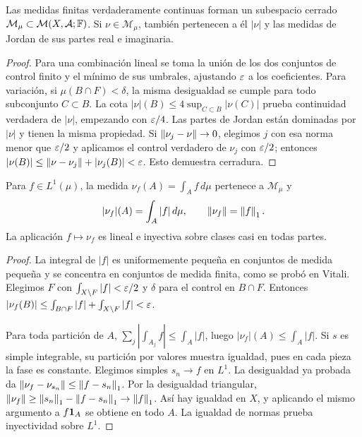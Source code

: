 \begin{proposicion}\label{v2:verdaderas-subespacio}
Las medidas finitas verdaderamente continuas forman un subespacio cerrado $\mathcal M_\mu\subset\mathcal M(X,\mathcal A;\mathbb F)$. Si $\nu\in\mathcal M_\mu$, también pertenecen a él $|\nu|$ y las medidas de Jordan de sus partes real e imaginaria.
\end{proposicion}
\begin{proof}
Para una combinación lineal se toma la unión de los dos conjuntos de control finito y el mínimo de sus umbrales, ajustando $\varepsilon$ a los coeficientes. Para variación, si $\mu(B\cap F)<\delta$, la misma desigualdad se cumple para todo subconjunto $C\subset B$. La cota $|\nu|(B)\le4\sup_{C\subset B}|\nu(C)|$ prueba continuidad verdadera de $|\nu|$, empezando con $\varepsilon/4$. Las partes de Jordan están dominadas por $|\nu|$ y tienen la misma propiedad. Si $\left\lVert\nu_j-\nu\right\rVert\to0$, elegimos $j$ con esa norma menor que $\varepsilon/2$ y aplicamos el control verdadero de $\nu_j$ con $\varepsilon/2$; entonces $|\nu(B)|\le\left\lVert\nu-\nu_j\right\rVert+|\nu_j(B)|<\varepsilon$. Esto demuestra cerradura.
\end{proof}
\begin{proposicion}\label{v2:densidad-variacion}
Para $f\in L^1(\mu)$, la medida $\nu_f(A)=\int_A f\,d\mu$ pertenece a $\mathcal M_\mu$ y
\[
 |\nu_f|(A)=\int_A|f|\,d\mu,\qquad \left\lVert\nu_f\right\rVert=\left\lVert f\right\rVert_1.
\]
La aplicación $f\mapsto\nu_f$ es lineal e inyectiva sobre clases casi en todas partes.
\end{proposicion}
\begin{proof}
La integral de $|f|$ es uniformemente pequeña en conjuntos de medida pequeña y se concentra en conjuntos de medida finita, como se probó en Vitali. Elegimos $F$ con $\int_{X\setminus F}|f|<\varepsilon/2$ y $\delta$ para el control en $B\cap F$. Entonces $|\nu_f(B)|\le\int_{B\cap F}|f|+\int_{X\setminus F}|f|<\varepsilon$.

Para toda partición de $A$, $\sum_j|\int_{A_j}f|\le\int_A|f|$, luego $|\nu_f|(A)\le\int_A|f|$. Si $s$ es simple integrable, su partición por valores muestra igualdad, pues en cada pieza la fase es constante. Elegimos simples $s_n\to f$ en $L^1$. La desigualdad ya probada da $\left\lVert\nu_f-\nu_{s_n}\right\rVert\le\left\lVert f-s_n\right\rVert_1$. Por la desigualdad triangular, $\left\lVert\nu_f\right\rVert\ge\left\lVert s_n\right\rVert_1-\left\lVert f-s_n\right\rVert_1\to\left\lVert f\right\rVert_1$. Así hay igualdad en $X$, y aplicando el mismo argumento a $f\mathbf1_{A}$ se obtiene en todo $A$. La igualdad de normas prueba inyectividad sobre $L^1$.
\end{proof}

